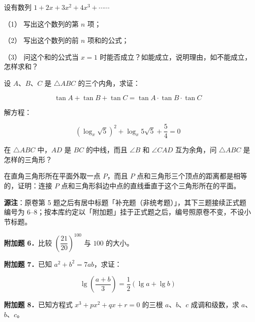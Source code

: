 

\begin{question}
设有数列 $1+2x+3x^2+4x^3+\cdots\cdots$

（1） 写出这个数列的第 $n$ 项；

（2） 写出这个数列的前 $n$ 项和的公式；

（3） 问这个和的公式当 $x=1$ 时能否成立？如能成立，说明理由，如不能成立，怎样求和？

\end{question}
\begin{question}
设 $A$、$B$、$C$ 是 $\triangle ABC$ 的三个内角，求证：

\nopagebreak[4]
\[
\tan A+\tan B+\tan C=\tan A\cdot\tan B\cdot\tan C
\]

\end{question}
\begin{question}
解方程：

\nopagebreak[4]
\[
\left(\log_x\sqrt5\right)^2+\log_x 5\sqrt5+\frac54=0
\]

\end{question}
\begin{question}
在 $\triangle ABC$ 中，$AD$ 是 $BC$ 的中线，而且 $\angle B$ 和 $\angle CAD$ 互为余角，问 $\triangle ABC$ 是怎样的三角形？

\end{question}
\begin{question}
在直角三角形所在平面外取一点 $P$，而且 $P$ 点和三角形三个顶点的距离都是相等的，证明：连接 $P$ 点和三角形斜边中点的直线垂直于这个三角形所在的平面。

\begin{gktip}
\textbf{源注}：原卷第 5 题之后有居中标题「补充题（非统考题）」，其下三题接续正式题编号为 $6$–$8$；按本库约定以「附加题」挂于正式题之后，编号照原卷不变，不设小节标题。
\end{gktip}

\textbf{附加题 6．}比较 $\left(\dfrac{21}{20}\right)^{100}$ 与 $100$ 的大小。

\textbf{附加题 7．}已知 $a^2+b^2=7ab$，求证：

\nopagebreak[4]
\[
\lg\left(\frac{a+b}{3}\right)=\frac12(\lg a+\lg b)
\]

\textbf{附加题 8．}已知方程式 $x^3+px^2+qx+r=0$ 的三根 $a$、$b$、$c$ 成调和级数，求 $a$、$b$、$c$。

\end{question}
